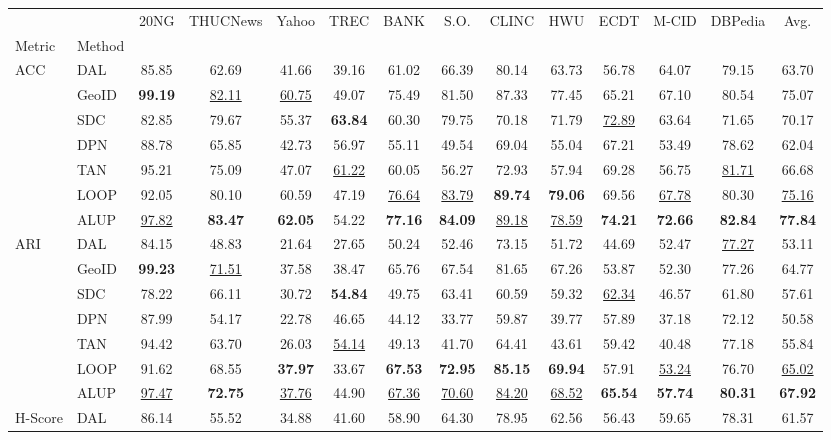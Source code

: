 \begin{tabular}{llcccccccccccc}
\toprule
&&20NG&THUCNews&Yahoo&TREC&BANK&S.O.&CLINC&HWU&ECDT&M-CID&DBPedia&Avg.\\
Metric&Method&&&&&&&&&&&&\\
\midrule
\multirow[t]{7}{*}{ACC}&DAL&85.85&62.69&41.66&39.16&61.02&66.39&80.14&63.73&56.78&64.07&79.15&63.70\\
&GeoID&\textbf{99.19}&\underline{82.11}&\underline{60.75}&49.07&75.49&81.50&87.33&77.45&65.21&67.10&80.54&75.07\\
&SDC&82.85&79.67&55.37&\textbf{63.84}&60.30&79.75&70.18&71.79&\underline{72.89}&63.64&71.65&70.17\\
&DPN&88.78&65.85&42.73&56.97&55.11&49.54&69.04&55.04&67.21&53.49&78.62&62.04\\
&TAN&95.21&75.09&47.07&\underline{61.22}&60.05&56.27&72.93&57.94&69.28&56.75&\underline{81.71}&66.68\\
&LOOP&92.05&80.10&60.59&47.19&\underline{76.64}&\underline{83.79}&\textbf{89.74}&\textbf{79.06}&69.56&\underline{67.78}&80.30&\underline{75.16}\\
&ALUP&\underline{97.82}&\textbf{83.47}&\textbf{62.05}&54.22&\textbf{77.16}&\textbf{84.09}&\underline{89.18}&\underline{78.59}&\textbf{74.21}&\textbf{72.66}&\textbf{82.84}&\textbf{77.84}\\
\cline{1-14}
\multirow[t]{7}{*}{ARI}&DAL&84.15&48.83&21.64&27.65&50.24&52.46&73.15&51.72&44.69&52.47&\underline{77.27}&53.11\\
&GeoID&\textbf{99.23}&\underline{71.51}&37.58&38.47&65.76&67.54&81.65&67.26&53.87&52.30&77.26&64.77\\
&SDC&78.22&66.11&30.72&\textbf{54.84}&49.75&63.41&60.59&59.32&\underline{62.34}&46.57&61.80&57.61\\
&DPN&87.99&54.17&22.78&46.65&44.12&33.77&59.87&39.77&57.89&37.18&72.12&50.58\\
&TAN&94.42&63.70&26.03&\underline{54.14}&49.13&41.70&64.41&43.61&59.42&40.48&77.18&55.84\\
&LOOP&91.62&68.55&\textbf{37.97}&33.67&\textbf{67.53}&\textbf{72.95}&\textbf{85.15}&\textbf{69.94}&57.91&\underline{53.24}&76.70&\underline{65.02}\\
&ALUP&\underline{97.47}&\textbf{72.75}&\underline{37.76}&44.90&\underline{67.36}&\underline{70.60}&\underline{84.20}&\underline{68.52}&\textbf{65.54}&\textbf{57.74}&\textbf{80.31}&\textbf{67.92}\\
\cline{1-14}
\multirow[t]{7}{*}{H-Score}&DAL&86.14&55.52&34.88&41.60&58.90&64.30&78.95&62.56&56.43&59.65&78.31&61.57\\

\end{tabular}
